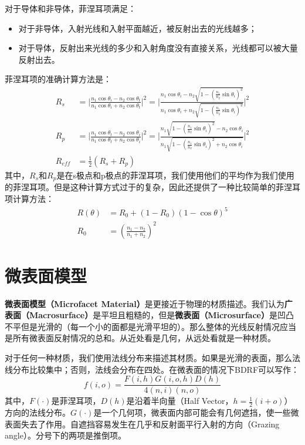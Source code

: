 \documentclass[openany]{progbookcn}
\begin{document}
对于导体和非导体，菲涅耳项满足：
\begin{itemize}
	\item 对于非导体，入射光线和入射平面越近，被反射出去的光线越多；
	\item 对于导体，反射出来光线的多少和入射角度没有直接关系，光线都可以被大量反射出去。
\end{itemize}

菲涅耳项的准确计算方法是：
\begin{equation}
	\begin{split}
		R_s&= \lvert\frac{n_1\cos\theta_i-n_2\cos\theta_t}{n_1\cos\theta_i+n_2\cos\theta_t}\rvert^2 = \lvert{\frac{n_1\cos\theta_i-n_2\sqrt{1-(\frac{n_1}{n_2}\sin\theta_i)^2}}{n_1\cos\theta_i+n_2\sqrt{1-(\frac{n_1}{n_2}\sin\theta_i)^2}}}\rvert^2\\
		R_p&= \lvert\frac{n_1\cos\theta_t-n_2\cos\theta_i}{n_1\cos\theta_t+n_2\cos\theta_i}\rvert^2 = \lvert{\frac{n_1\sqrt{1-(\frac{n_1}{n_2}\sin\theta_i)^2}-n_2\cos\theta_i}{n_1\sqrt{1-(\frac{n_1}{n_2}\sin\theta_i)^2+n_2\cos\theta_i}}}\rvert^2\\
		R_{eff}&=\frac{1}{2}(R_s+R_p)
	\end{split}
\end{equation}
其中，$R_s$和$R_p$是在s极点和p极点的菲涅耳项，我们使用他们的平均作为我们使用的菲涅耳项。但是这种计算方式过于的复杂，因此还提供了一种比较简单的菲涅耳项计算方法：
\begin{equation}
	\begin{split}
		R(\theta)&=R_0+(1-R_0)(1-\cos\theta)^5\\
		R_0&=(\frac{n_1-n_2}{n_1+n_2})^2
	\end{split}
\end{equation}

\section{微表面模型}

\textbf{微表面模型（Microfacet Material）}是更接近于物理的材质描述。我们认为\textbf{广表面（Macrosurface）}是平坦且粗糙的，但是\textbf{微表面（Microsurface）}是凹凸不平但是光滑的（每一个小的面都是光滑平坦的）。那么整体的光线反射情况应当是所有微表面反射情况的总和。从近处看是几何，从远处看就是一种材质。

对于任何一种材质，我们使用法线分布来描述其材质。如果是光滑的表面，那么法线分布比较集中；否则，法线会分布在四处。在微表面的情况下BDRF可以写作：
\begin{equation}
	f(i,o)=\frac{F(i,h)G(i,o,h)D(h)}{4(n,i)(n,o)}
\end{equation}
其中，$F(\cdot)$是菲涅耳项，$D(h)$是沿着半向量（Half Vector，$h=\frac{1}{2}(i+o)$）方向的法线分布。$G(\cdot)$是一个几何项，微表面内部可能会有几何遮挡，使一些微表面失去了作用。自遮挡容易发生在几乎和反射面平行入射的方向（Grazing angle）。分号下的两项是推倒项。
\end{document}
